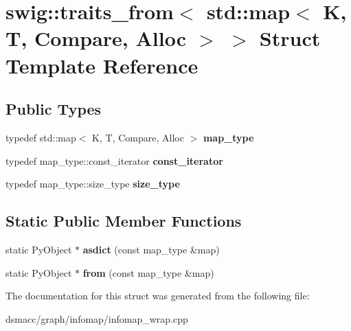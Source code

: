 \hypertarget{structswig_1_1traits__from_3_01std_1_1map_3_01K_00_01T_00_01Compare_00_01Alloc_01_4_01_4}{}\section{swig\+:\+:traits\+\_\+from$<$ std\+:\+:map$<$ K, T, Compare, Alloc $>$ $>$ Struct Template Reference}
\label{structswig_1_1traits__from_3_01std_1_1map_3_01K_00_01T_00_01Compare_00_01Alloc_01_4_01_4}
\subsection*{Public Types}
\begin{DoxyCompactItemize}
\item 
\mbox{\label{structswig_1_1traits__from_3_01std_1_1map_3_01K_00_01T_00_01Compare_00_01Alloc_01_4_01_4_a9b1b18fe3260445279169d47a71caf5f}} 
typedef std\+::map$<$ K, T, Compare, Alloc $>$ {\bfseries map\+\_\+type}
\item 
\mbox{\label{structswig_1_1traits__from_3_01std_1_1map_3_01K_00_01T_00_01Compare_00_01Alloc_01_4_01_4_a79bfdd6c1c4f9d06cc15348c56bfe5be}} 
typedef map\+\_\+type\+::const\+\_\+iterator {\bfseries const\+\_\+iterator}
\item 
\mbox{\label{structswig_1_1traits__from_3_01std_1_1map_3_01K_00_01T_00_01Compare_00_01Alloc_01_4_01_4_aff705e529c0e316017d57d0e99396ac5}} 
typedef map\+\_\+type\+::size\+\_\+type {\bfseries size\+\_\+type}
\end{DoxyCompactItemize}
\subsection*{Static Public Member Functions}
\begin{DoxyCompactItemize}
\item 
\mbox{\label{structswig_1_1traits__from_3_01std_1_1map_3_01K_00_01T_00_01Compare_00_01Alloc_01_4_01_4_a27e1b651c802e7e0cd31e835da1158f1}} 
static Py\+Object $\ast$ {\bfseries asdict} (const map\+\_\+type \&map)
\item 
\mbox{\label{structswig_1_1traits__from_3_01std_1_1map_3_01K_00_01T_00_01Compare_00_01Alloc_01_4_01_4_a215ce375f295de427bb6a6b51862ca7c}} 
static Py\+Object $\ast$ {\bfseries from} (const map\+\_\+type \&map)
\end{DoxyCompactItemize}


The documentation for this struct was generated from the following file\+:\begin{DoxyCompactItemize}
\item 
dsmacc/graph/infomap/infomap\+\_\+wrap.\+cpp\end{DoxyCompactItemize}
